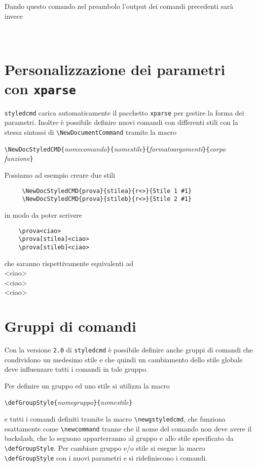 \documentclass[a4paper]{article}
\begin{document}
Dando questo comando nel preambolo l'output dei comandi precedenti sarà invece\\
\\
\\

\section{Personalizzazione dei parametri con \texttt{xparse}}
\verb+styledcmd+ carica automaticamente il pacchetto \verb+xparse+ per gestire la forma dei parametri. Inoltre è possibile definire nuovi comandi con differenti stili con la stessa sintassi di \verb+\NewDocumentCommand+ tramite la macro

\verb+\NewDocStyledCMD{+\textit{nomecomando}\verb+}{+\textit{nomestile}\verb+}{+\textit{formatoargomenti}\verb+}{+\textit{corpo funzione}\verb+}+

Possiamo ad esempio creare due stili
\begin{verbatim}
     \NewDocStyledCMD{prova}{stilea}{r<>}{Stile 1 #1}
     \NewDocStyledCMD{prova}{stileb}{r<>}{Stile 2 #1}
\end{verbatim}
in modo da poter scrivere
\begin{verbatim}
    \prova<ciao>
    \prova[stilea]<ciao>
    \prova[stileb]<ciao>
\end{verbatim}
che saranno rispettivamente equivalenti ad\\
    \prova<ciao>\\
    \prova[stilea]<ciao>\\
    \prova[stileb]<ciao>
    
\section{Gruppi di comandi}
Con la versione \verb+2.0+ di \verb+styledcmd+ è possibile definire anche gruppi di comandi che condividono un medesimo stile e che quindi un cambiamento dello stile globale deve influenzare tutti i comandi in tale gruppo.

Per definire un gruppo ed uno stile si utilizza la macro

\verb+\defGroupStyle{+\textit{nomegruppo}\verb+}{+\textit{nomestile}\verb+}+

e tutti i comandi definiti tramite la macro \verb+\newgstyledcmd+, che funziona esattamente come \verb+\newcommand+ tranne che il nome del comando non deve avere il backslash, che lo seguono apparterranno al gruppo e allo stile specificato da \verb+\defGroupStyle+. Per cambiare gruppo e/o stile si esegue la macro \verb+\defGroupStyle+ con i nuovi parametri e si ridefiniscono i comandi.
\end{document}

